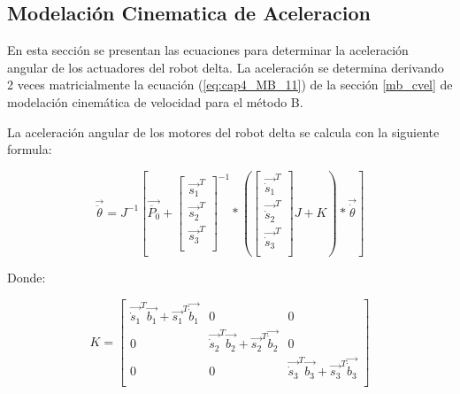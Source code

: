     \subsection{Modelación Cinematica de Aceleracion}
        
        En esta sección se presentan las ecuaciones para determinar la aceleración angular de los actuadores del robot delta. La aceleración se determina derivando 2 veces matricialmente la ecuación (\ref{eq:cap4_MB_11}) de la sección \ref{mb_cvel} de modelación cinemática de velocidad para el método B.
        
        La aceleración angular de los motores del robot delta se calcula con la siguiente formula:
        
        
        \begin{equation}
                    \overrightarrow{\ddot{ \theta }}=J^{-1} \left[ \overrightarrow{\ddot{P_{0}}}+ \left[ \begin{matrix}
                \overrightarrow{s_{1}}^{T}\\
                \overrightarrow{s_{2}}^{T}\\
                \overrightarrow{s_{3}}^{T}\\
                \end{matrix}
                 \right] ^{-1} \ast \left(  \left[ \begin{matrix}
                \overrightarrow{\dot{s}_{1}}^{T}\\
                \overrightarrow{\dot{s}_{2}}^{T}\\
                \overrightarrow{\dot{s}_{3}}^{T}\\
                \end{matrix}
                 \right]  J+K \right) \ast\overrightarrow{\dot{ \theta }} \right]
            \label{eq:cap4_MB_16}
        \end{equation} 

        Donde: 

        \begin{equation}
                 K= \left[ \begin{matrix}
                \overrightarrow{\dot{s}_{1}}^{T}\overrightarrow{b_{1}}+\overrightarrow{s_{1}}^{T}\overrightarrow{\dot{b}_{1}}  &  0  &  0\\
                0  &  \overrightarrow{\dot{s}_{2}}^{T}\overrightarrow{b_{2}}+\overrightarrow{s_{2}}^{T}\overrightarrow{\dot{b}_{2}}  &  0\\
                0  &  0  &  \overrightarrow{\dot{s}_{3}}^{T}\overrightarrow{b_{3}}+\overrightarrow{s_{3}}^{T}\overrightarrow{\dot{b}_{3}}\\
                \end{matrix}
                 \right]  
            \label{eq:cap4_MB_17}
        \end{equation} 
        

